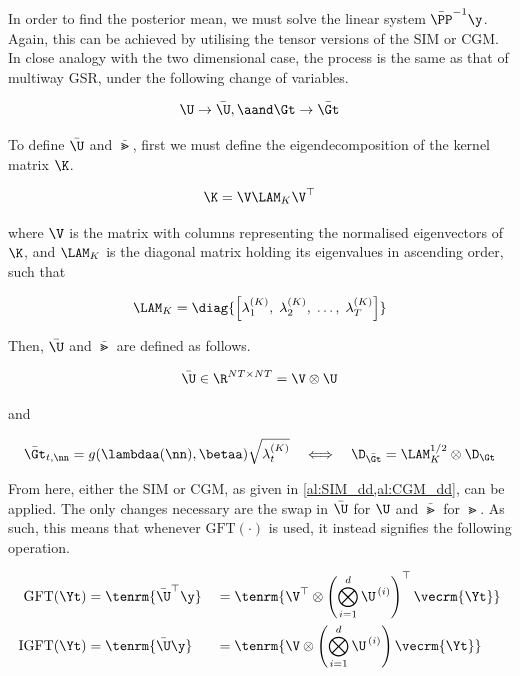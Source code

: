In order to find the posterior mean, we must solve the linear system $\bar{\PP}^{-1} \y$. Again, this can be achieved by utilising the tensor versions of the SIM or CGM. In close analogy with the two dimensional case, the process is the same as that of multiway GSR, under the following change of variables. 

\begin{equation}
    \U \rightarrow \bar{\U}, \aand \Gt \rightarrow \bar{\Gt}
\end{equation}

To define $\bar{\U}$ and $\bar{\Gt}$, first we must define the eigendecomposition of the kernel matrix $\K$. 

\begin{equation}
    \K = \V \LAM_K \V^\top
\end{equation}

where $\V$ is the matrix with columns representing the normalised eigenvectors of $\K$, and $\LAM_K$ is the diagonal matrix holding its eigenvalues in ascending order, such that  

\begin{equation}
\LAM_K = \diag{\left[\lambda^{(K)}_1, \; \lambda^{(K)}_2, \; \dots, \;\lambda^{(K)}_T \right]}
\end{equation}

Then, $\bar{\U}$ and $\bar{\Gt}$ are defined as follows.

\begin{equation}
    \bar{\U} \in \R^{NT \times NT} = \V \otimes \U
\end{equation}

and 

\begin{equation}
    \bar{\Gt}_{t, \nn} = g(\lambdaa(\nn), \betaa) \sqrt{\lambda_t^{(K)}} \quad \Longleftrightarrow \quad \D_{\bar{\Gt}} = \LAM_K^{1/2} \otimes \D_\Gt 
\end{equation}

From here, either the SIM or CGM, as given in \cref{al:SIM_dd,al:CGM_dd}, can be applied. The only changes necessary are the swap in $\bar{\U}$ for $\U$ and $\bar{\Gt}$ for $\Gt$. As such, this means that whenever $\text{GFT}(\cdot)$ is used, it instead signifies the following operation.  

\begin{alignat}{2}
    \label{eq:gftp_nd}
        \text{GFT}(\Yt) & = \tenrm{\bar{\U}^\top \y} && = \tenrm{\V^\top \otimes \left(  \bigotimes_{i=1}^d  \U^{\,(i)} \right)^\top \vecrm{\Yt} } \\
    \label{eq:igftp_nd}
        \text{IGFT}(\Yt) & = \tenrm{\bar{\U} \y} && = \tenrm{\V \otimes \left(  \bigotimes_{i=1}^d  \U^{\,(i)} \right) \vecrm{\Yt} }
\end{alignat}


